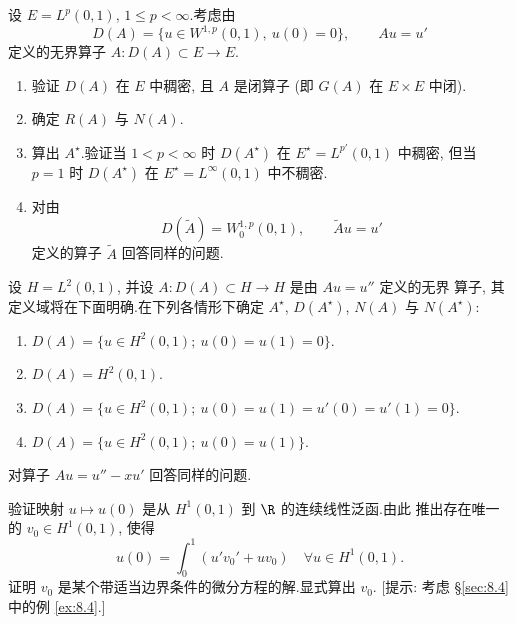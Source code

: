 \begin{exercise}
\label{exer:8.16}
设 $E=L^p(0,1)$, $1\le p<\infty$.考虑由
\begin{equation*}
D(A)=\{u\in W^{1,p}(0,1),\ u(0)=0\},\qquad Au=u'
\end{equation*}
定义的无界算子 $A:D(A)\subset E\to E$.
\begin{enumerate}[label=\arabic*., leftmargin=2.2em, itemsep=0.3em]
	\item 验证 $D(A)$ 在 $E$ 中稠密, 且 $A$ 是闭算子 (即 $G(A)$ 在
	      $E\times E$ 中闭).
	\item 确定 $R(A)$ 与 $N(A)$.
	\item 算出 $A^\star$.验证当 $1<p<\infty$ 时 $D(A^\star)$ 在
	      $E^\star=L^{p'}(0,1)$ 中稠密, 但当 $p=1$ 时 $D(A^\star)$ 在
	      $E^\star=L^\infty(0,1)$ 中不稠密.
	\item 对由
	      \begin{equation*}
	      D(\tilde A)=W_0^{1,p}(0,1),\qquad \tilde Au=u'
	      \end{equation*}
	      定义的算子 $\tilde A$ 回答同样的问题.
\end{enumerate}
\end{exercise}

\begin{exercise}
\label{exer:8.17}
设 $H=L^2(0,1)$, 并设 $A:D(A)\subset H\to H$ 是由 $Au=u''$ 定义的无界
算子, 其定义域将在下面明确.在下列各情形下确定 $A^\star$, $D(A^\star)$,
$N(A)$ 与 $N(A^\star)$:
\begin{enumerate}[label=\arabic*., leftmargin=2.2em, itemsep=0.3em]
	\item $D(A)=\{u\in H^2(0,1);\ u(0)=u(1)=0\}$.
	\item $D(A)=H^2(0,1)$.
	\item $D(A)=\{u\in H^2(0,1);\ u(0)=u(1)=u'(0)=u'(1)=0\}$.
	\item $D(A)=\{u\in H^2(0,1);\ u(0)=u(1)\}$.
\end{enumerate}
对算子 $Au=u''-xu'$ 回答同样的问题.
\end{exercise}

\begin{exercise}
\label{exer:8.18}
验证映射 $u\mapsto u(0)$ 是从 $H^1(0,1)$ 到 $\R$ 的连续线性泛函.由此
推出存在唯一的 $v_0\in H^1(0,1)$, 使得
\begin{equation*}
u(0)=\int_0^1(u'v_0'+uv_0)\quad\forall u\in H^1(0,1).
\end{equation*}
证明 $v_0$ 是某个带适当边界条件的微分方程的解.显式算出 $v_0$.
[提示: 考虑 \S \ref{sec:8.4} 中的例 \ref{ex:8.4}.]
\end{exercise}

